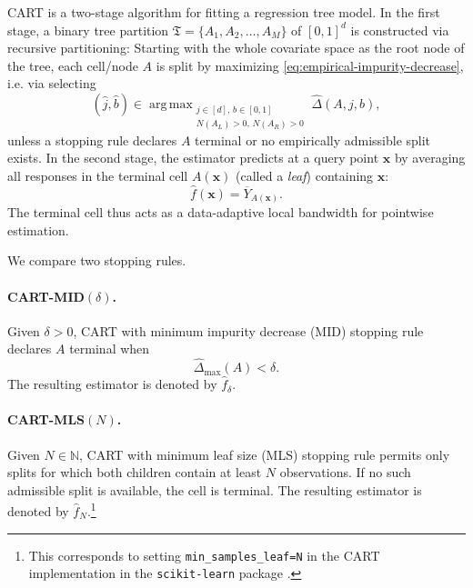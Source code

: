 \documentclass[11pt]{article}
\theoremstyle{plain}
\theoremstyle{definition}
\theoremstyle{remark}
\theoremstyle{plain}
\newcommand{\bx}{\mathbf{x}}
\DeclareMathOperator*{\argmax}{arg\,max}
\newcommand{\tree}{\mathfrak{T}}
\newcommand{\1}{\mathbbm{1}}
\begin{document}
CART is a two-stage algorithm for fitting a regression tree model. 
In the first stage, a binary tree partition $\tree = \lbrace A_1,A_2,\ldots, A_M \rbrace$ of $[0,1]^d$ is constructed via recursive partitioning:
Starting with the whole covariate space as the root node of the tree, each cell/node $A$ is split by maximizing \eqref{eq:empirical-impurity-decrease}, i.e. via selecting
\begin{equation}
\label{equ::jstar}
(\hat j,\hat b)
\in
\argmax_{\substack{j\in[d],\,b\in[0,1]\\
N(A_L)>0,\,N(A_R)>0}}
\widehat\Delta(A,j,b),
\end{equation}
unless a stopping rule declares $A$ terminal or no empirically admissible
split exists. In the second stage, the estimator predicts at a query point $\bx$ by averaging all responses in the terminal cell $A(\bx)$ (called a \emph{leaf}) containing $\bx$:
\[
\hat f(\bx) = \overline Y_{A(\bx)}.
\]
The terminal cell thus acts as a data-adaptive local bandwidth for pointwise estimation.

We compare two stopping rules.

\paragraph{CART-MID$(\delta)$.}
Given $\delta>0$, CART with minimum impurity decrease (MID) stopping rule declares $A$ terminal when
\[
\widehat\Delta_{\max}(A)<\delta.
\]
The resulting estimator is denoted by $\hat f_\delta$.

\paragraph{CART-MLS$(N)$.}
Given $N\in\mathbb N$, CART with minimum leaf size (MLS) stopping rule permits only splits for which both children contain at least $N$ observations. If no such admissible split is available, the cell is terminal. The resulting estimator is denoted by $\hat f_N$.\footnote{This corresponds to setting \texttt{min\_samples\_leaf=N} in the CART implementation in the \texttt{scikit-learn} package \citep{pedregosa2011scikit}.}

\end{document}
